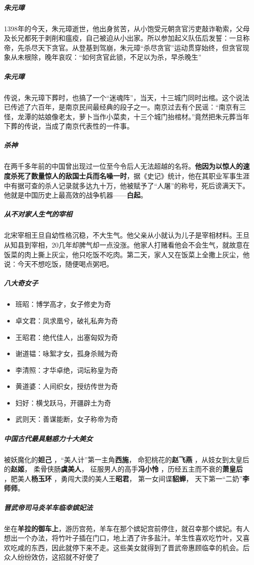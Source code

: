 \documentclass[UTF8,a4paper,12pt]{ctexbook}
\begin{document}
		\subparagraph{朱元璋}1398年的今天，朱元璋逝世，他出身贫苦，从小饱受元朝贪官污吏敲诈勒索，父母及长兄都死于剥削和瘟疫，自己被迫从小出家。所以参加起义队伍后发誓：一旦称帝，先杀尽天下贪官。从登基到驾崩，朱元璋“杀尽贪官”运动贯穿始终，但贪官现象从未根除，晚年哀叹：“如何贪官此锁，不足以为杀，早杀晚生”	
		
		\subparagraph{朱元璋}传说，朱元璋下葬时，也搞了一个“迷魂阵”，当天，十三城门同时出棺。这个说法已传述了六百年，是南京民间最经典的段子之一。南京过去有个民谣：“南京有三怪，龙潭的姑娘像老太，萝卜当作小菜卖，十三个城门抬棺材。”竟然把朱元葬当年下葬的传说，当成了南京代表性的一件事。
		
		\subparagraph{杀神}在两千多年前的中国曾出现过一位至今令后人无法超越的名将。\textbf{他因为以惊人的速度杀死了数量惊人的敌国士兵而名噪一时}，据《史记》统计，他在其职业军事生涯中有据可查的杀人记录就多达九十万，他被赋予了“人屠”的称号，死后谤满天下。他就是中国历史上最高效的战争机器——\textbf{白起}。
		
		\subparagraph{从不对家人生气的宰相}北宋宰相王旦自幼性格沉稳，不大生气。他父亲从小就认为儿子是宰相材料。王旦从知县到宰相，20几年却脾气却一点没涨。他家人打赌看他会不会生气，就故意在饭菜的肉上撕上灰尘，他只吃饭不吃肉。第二天，家人又在饭菜上全撒上灰尘，他说：今天不想吃饭，随便喝点粥吧。
		
		\subparagraph{八大奇女子}
			\begin{itemize}
				\item 班昭：博学高才，女子修史为奇
				\item 卓文君：凤求凰兮，破礼私奔为奇
				\item 王昭君：绝代佳人，出塞匈奴为奇
				\item 谢道韫：咏絮才女，孤身杀贼为奇
				\item 李清照：才华卓绝，词坛称皇为奇
				\item 黄道婆：人间织女，授纺传世为奇
				\item 妇好：横戈跃马，开疆辟土为奇
				\item 武则天：善谋能断，女子称帝为奇
			\end{itemize}
		\subparagraph{中国古代最具魅惑力十大美女}被妖魔化的\textbf{妲己} ，“美人计”第一主角\textbf{西施}， 命犯桃花的\textbf{赵飞燕} ，从妓女到太皇后的\textbf{赵姬}， 柔骨侠肠\textbf{虞美人}， 征服男人的高手\textbf{冯小怜} ，历经五主而不衰的\textbf{萧皇后} ，肥美人\textbf{杨玉环} ，勇闯大漠的美人王\textbf{昭君}， 第一女间谍\textbf{貂蝉}， 天下第一“二奶”\textbf{李师师}。	
		
		\subparagraph{晋武帝司马炎羊车临幸嫔妃法}坐在\textbf{羊拉的御车上}，游历宫苑，羊车在那个嫔妃宫前停住，就召幸那个嫔妃。有人想出一个办法，将竹叶子插在门口，地上洒了许多盐汁。羊生性喜欢吃竹叶，又喜欢吃咸的东西，因此就停下来不走。这些美女就得到了晋武帝惠顾临幸的机会。后众人纷纷效仿，这招就不好使了
		
\end{document}

